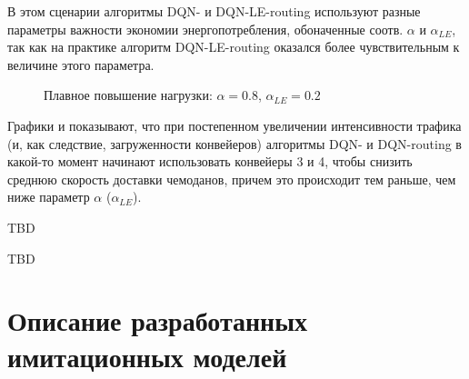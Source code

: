 \documentclass[specification,annotation,times]{itmo-student-thesis}
\theoremstyle{definition}
\begin{document}
В этом сценарии алгоритмы DQN- и DQN-LE-routing используют разные параметры
важности экономии энергопотребления, обоначенные соотв. $\alpha$ и
$\alpha_{LE}$, так как на практике алгоритм DQN-LE-routing оказался более
чувствительным к величине этого параметра.

\begin{figure}[!h]
  \centering
  \hfil
  \caption{Плавное повышение нагрузки: $\alpha = 0.8$, $\alpha_{LE} = 0.2$}\label{experiments:conveyors:2-early}
\end{figure}

Графики \label{experiments:conveyors:2-late}
и \label{experiments:conveyors:2-early} показывают, что при постепенном
увеличении интенсивности трафика (и, как следствие, загруженности конвейеров)
алгоритмы DQN- и DQN-routing в какой-то момент начинают использовать конвейеры 3
и 4, чтобы снизить среднюю скорость доставки чемоданов, причем это происходит
тем раньше, чем ниже параметр $\alpha$ ($\alpha_{LE}$).

\chapterconclusion

TBD

\startconclusionpage

TBD

\printmainbibliography

\appendix



\chapter{Описание разработанных имитационных моделей}\label{apx:simulators}
\end{document}
